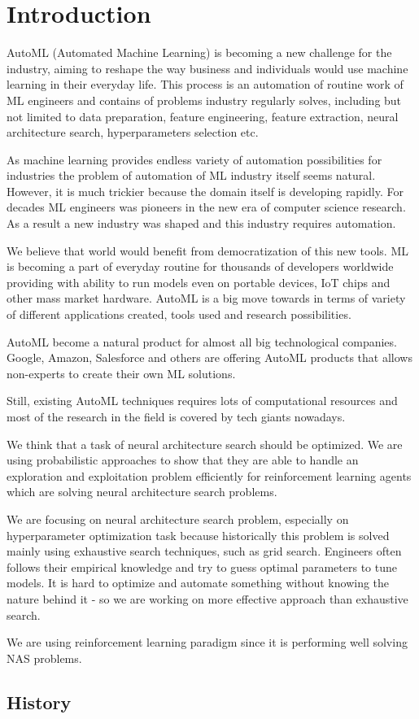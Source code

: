 
\chapter{Introduction}

AutoML (Automated Machine Learning) is becoming a new challenge for the industry, aiming to reshape the way business and individuals would use machine learning in their everyday life. This process is an automation of routine work of ML engineers and contains of problems industry regularly solves, including but not limited to data preparation, feature engineering, feature extraction, neural architecture search, hyperparameters selection etc.

As machine learning provides endless variety of automation possibilities for industries the problem of automation of ML industry itself seems natural. However, it is much trickier because the domain itself is developing rapidly. For decades ML engineers was pioneers in the new era of computer science research. As a result a new industry was shaped and this industry requires automation.

We believe that world would benefit from democratization of this new tools.
ML is becoming a part of everyday routine for thousands of developers worldwide providing with ability to run models even on portable devices, IoT chips and other mass market hardware. AutoML is a big move towards in terms of variety of different applications created, tools used and research possibilities.

AutoML become a natural product for almost all big technological companies. Google, Amazon, Salesforce and others are offering AutoML products that allows non-experts to create their own ML solutions.

Still, existing AutoML techniques requires lots of computational resources and most of the research in the field is covered by tech giants nowadays. 

We think that a task of neural architecture search should be optimized. We are using probabilistic approaches to show that they are able to handle an exploration and exploitation problem efficiently for reinforcement learning agents which are solving neural architecture search problems.

We are focusing on neural architecture search problem, especially on hyperparameter optimization task because historically this problem is solved mainly using exhaustive search techniques, such as grid search. Engineers often follows their empirical knowledge and try to guess optimal parameters to tune models. It is hard to optimize and automate something without knowing the nature behind it - so we are working on more effective approach than exhaustive search.

We are using reinforcement learning paradigm since it is performing well solving NAS problems. \cite[See][]{ZophL16}

\section{History}



\endinput